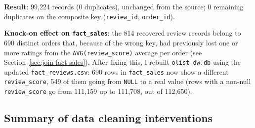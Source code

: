 \documentclass[12pt,a4paper]{article}
\begin{document}
\textbf{Result}: 99,224 records (0 duplicates), unchanged from the source; 0
remaining duplicates on the composite key (\texttt{review\_id}, \texttt{order\_id}).

\textbf{Knock-on effect on \texttt{fact\_sales}}: the 814 recovered review records
belong to 690 distinct orders that, because of the wrong key, had previously lost
one or more ratings from the \texttt{AVG(review\_score)} average per order (see
Section~\ref{sec:join-fact-sales}). After fixing this, I rebuilt
\texttt{olist\_dw.db} using the updated \texttt{fact\_reviews.csv}: 690 rows in
\texttt{fact\_sales} now show a different \texttt{review\_score}, 549 of them going
from \texttt{NULL} to a real value (rows with a non-null \texttt{review\_score} go
from 111,159 up to 111,708, out of 112,650).

\subsection{Summary of data cleaning interventions}
\end{document}
